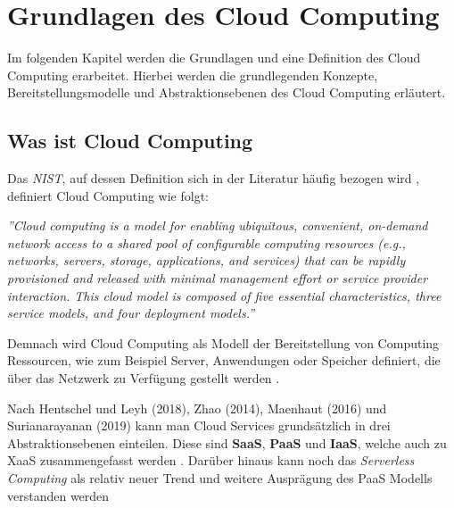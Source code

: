\section{Grundlagen des Cloud Computing}
\label{sec:cloud-computing}

Im folgenden Kapitel werden die Grundlagen und eine Definition des Cloud Computing erarbeitet. Hierbei werden die grundlegenden Konzepte, Bereitstellungsmodelle und Abstraktionsebenen des Cloud Computing erläutert.

\subsection{Was ist Cloud Computing}
Das \textit{\ac{NIST}}, auf dessen Definition sich in der Literatur häufig bezogen wird \cite[Vgl.][S. 4f]{Reinheimer2018}, definiert Cloud Computing wie folgt:

\textit{''Cloud computing is a model for enabling ubiquitous, convenient, on-demand network access to a shared pool of configurable computing resources (e.g., networks, servers, storage, applications, and services) that can be rapidly provisioned and released with minimal management effort or service provider interaction. This cloud model is composed of five essential characteristics, three service models, and four deployment models.''} \cite[][S. 2]{Mell2011}

Demnach wird Cloud Computing als Modell der Bereitstellung von Computing Ressourcen, wie zum Beispiel Server, Anwendungen oder Speicher definiert, die über das Netzwerk zu Verfügung gestellt werden \cite[Vgl.][S. 5]{Reinheimer2018}.

Nach Hentschel und Leyh (2018), Zhao (2014), Maenhaut (2016) und Surianarayanan (2019) kann man Cloud Services grundsätzlich in drei Abstraktionsebenen einteilen. Diese sind \textbf{\ac{SaaS}}, \textbf{\ac{PaaS}} und \textbf{\ac{IaaS}}, welche auch zu \ac{XaaS} zusammengefasst werden \cite[Vgl.][S. 9]{Reinheimer2018}\cite[Vgl.][S. 143f]{Zhao2014}\cite[Vgl.][S. 32ff]{Maenhaut2016}\cite[Vgl.][S. 226ff]{Surianarayanan2019}.
Darüber hinaus kann noch das \textit{Serverless Computing} als relativ neuer Trend und weitere Ausprägung des \ac{PaaS} Modells verstanden werden \cite[Vgl.][S. 11ff]{CNCF2018} \pagebreak

